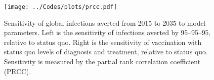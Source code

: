 \documentclass{article}
\begin{document}
\begin{figure}
  \centering
  \texttt{[image: ../Codes/plots/prcc.pdf]}
  \caption{Sensitivity of global infections averted from 2015 to 2035
    to model parameters.  Left is the sensitivity of infections
    averted by 95--95--95, relative to status quo.  Right is the
    sensitivity of vaccination with status quo levels of diagnosis and
    treatment, relative to status quo.  Sensitivity is measured by the
    partial rank correlation coefficient (PRCC).}
  \label{PRCCs}
\end{figure}
\end{document}
